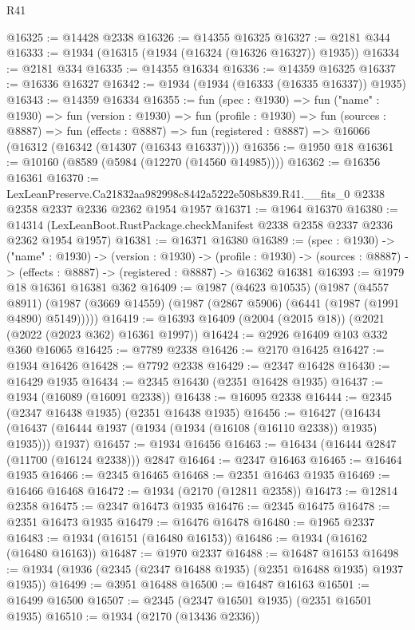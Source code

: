 \begin{lexlean}{R41}
\begin{coremodule}
@16325 := @14428 @2338
@16326 := @14355 @16325
@16327 := @2181 @344
@16333 := @1934 (@16315 (@1934 (@16324 (@16326 @16327)) @1935))
@16334 := @2181 @334
@16335 := @14355 @16334
@16336 := @14359 @16325
@16337 := @16336 @16327
@16342 := @1934 (@1934 (@16333 (@16335 @16337)) @1935)
@16343 := @14359 @16334
@16355 := fun (spec : @1930) =>
  fun ("name" : @1930) =>
  fun (version : @1930) =>
  fun (profile : @1930) =>
  fun (sources : @8887) =>
  fun (effects : @8887) =>
  fun (registered : @8887) => @16066 (@16312 (@16342 (@14307 (@16343 @16337))))
@16356 := @1950 @18
@16361 := @10160 (@8589 (@5984 (@12270 (@14560 @14985))))
@16362 := @16356 @16361
@16370 := LexLeanPreserve.Ca21832aa982998c8442a5222e508b839.R41.__fits_0
    @2338
    @2358
    @2337
    @2336
    @2362
    @1954
    @1957
@16371 := @1964 @16370
@16380 := @14314 (LexLeanBoot.RustPackage.checkManifest @2338 @2358 @2337 @2336 @2362 @1954 @1957)
@16381 := @16371 @16380
@16389 := (spec : @1930) ->
  ("name" : @1930) ->
  (version : @1930) ->
  (profile : @1930) ->
  (sources : @8887) -> (effects : @8887) -> (registered : @8887) -> @16362 @16381
@16393 := @1979 @18 @16361 @16381 @362
@16409 := @1987
    (@4623 @10535)
    (@1987
      (@4557 @8911)
      (@1987 (@3669 @14559) (@1987 (@2867 @5906) (@6441 (@1987 (@1991 @4890) @5149)))))
@16419 := @16393 @16409 (@2004 (@2015 @18)) (@2021 (@2022 (@2023 @362) @16361 @1997))
@16424 := @2926 @16409 @103 @332 @360 @16065
@16425 := @7789 @2338
@16426 := @2170 @16425
@16427 := @1934 @16426
@16428 := @7792 @2338
@16429 := @2347 @16428
@16430 := @16429 @1935
@16434 := @2345 @16430 (@2351 @16428 @1935)
@16437 := @1934 (@16089 (@16091 @2338))
@16438 := @16095 @2338
@16444 := @2345 (@2347 @16438 @1935) (@2351 @16438 @1935)
@16456 := @16427
    (@16434 (@16437 (@16444 @1937 (@1934 (@1934 (@16108 (@16110 @2338)) @1935) @1935))) @1937)
@16457 := @1934 @16456
@16463 := @16434 (@16444 @2847 (@11700 (@16124 @2338))) @2847
@16464 := @2347 @16463
@16465 := @16464 @1935
@16466 := @2345 @16465
@16468 := @2351 @16463 @1935
@16469 := @16466 @16468
@16472 := @1934 (@2170 (@12811 @2358))
@16473 := @12814 @2358
@16475 := @2347 @16473 @1935
@16476 := @2345 @16475
@16478 := @2351 @16473 @1935
@16479 := @16476 @16478
@16480 := @1965 @2337
@16483 := @1934 (@16151 (@16480 @16153))
@16486 := @1934 (@16162 (@16480 @16163))
@16487 := @1970 @2337
@16488 := @16487 @16153
@16498 := @1934 (@1936 (@2345 (@2347 @16488 @1935) (@2351 @16488 @1935) @1937 @1935))
@16499 := @3951 @16488
@16500 := @16487 @16163
@16501 := @16499 @16500
@16507 := @2345 (@2347 @16501 @1935) (@2351 @16501 @1935)
@16510 := @1934 (@2170 (@13436 @2336))

\end{coremodule}
\end{lexlean}
